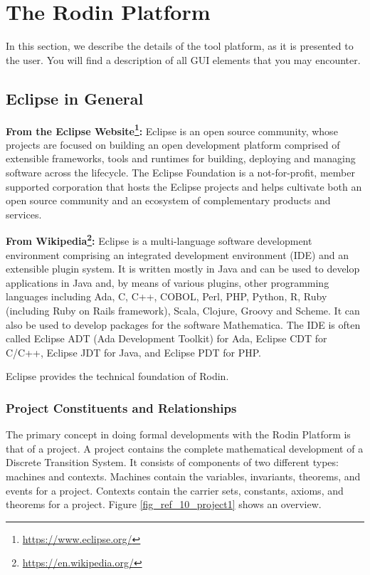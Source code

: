 \section{The Rodin Platform}
\label{rodin_platform}

In this section, we describe the details of the tool platform, as it is presented to the user.  You will find a description of all GUI elements that you may encounter.

\subsection{Eclipse in General}
\label{eclipse}

\textbf{From the Eclipse Website\footnote{\url{https://www.eclipse.org/}}:}
Eclipse is an open source community, whose projects are focused on building an open development platform comprised of extensible frameworks, tools and runtimes for building, deploying and managing software across the lifecycle. The Eclipse Foundation is a not-for-profit, member supported corporation that hosts the Eclipse projects and helps cultivate both an open source community and an ecosystem of complementary products and services.

\textbf{From Wikipedia\footnote{\url{https://en.wikipedia.org/}}:}
Eclipse is a multi-language software development environment comprising an integrated development environment (IDE) and an extensible plugin system. It is written mostly in Java and can be used to develop applications in Java and, by means of various plugins, other programming languages including Ada, C, C++, COBOL, Perl, PHP, Python, R, Ruby (including Ruby on Rails framework), Scala, Clojure, Groovy and Scheme. It can also be used to develop packages for the software Mathematica. The IDE is often called Eclipse ADT (Ada Development Toolkit) for Ada, Eclipse CDT for C/C++, Eclipse JDT for Java, and Eclipse PDT for PHP.

Eclipse provides the technical foundation of Rodin.

\subsubsection{Project Constituents and Relationships}
\label{project}

The primary concept in doing formal developments with the Rodin Platform is that of a project. A project contains the complete mathematical development of a Discrete Transition System. It consists of components of two different types: machines and contexts. Machines contain the variables, invariants, theorems, and events for a project. Contexts contain the carrier sets, constants, axioms, and theorems for a project. Figure \ref{fig_ref_10_project1} shows an overview.

